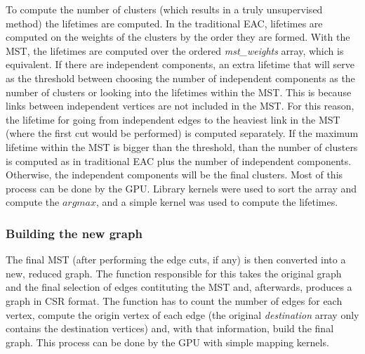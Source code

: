 To compute the number of clusters (which results in a truly unsupervised method) the lifetimes are computed.
In the traditional EAC, lifetimes are computed on the weights of the clusters by the order they are formed.
With the MST, the lifetimes are computed over the ordered \emph{mst\_weights} array, which is equivalent.
If there are independent components, an extra lifetime that will serve as the threshold between choosing the number of independent components as the number of clusters or looking into the lifetimes within the MST.
This is because links between independent vertices are not included in the MST.
For this reason, the lifetime for going from independent edges to the heaviest link in the MST (where the first cut would be performed) is computed separately.
If the maximum lifetime within the MST is bigger than the threshold, than the number of clusters is computed as in traditional EAC plus the number of independent components.
Otherwise, the independent components will be the final clusters.
Most of this process can be done by the GPU.
Library kernels were used to sort the array and compute the $arg max$, and a simple kernel was used to compute the lifetimes.

\subsubsection{Building the new graph}
The final MST (after performing the edge cuts, if any) is then converted into a new, reduced graph.
The function responsible for this takes the original graph and the final selection of edges contituting the MST and, afterwards, produces a graph in CSR format.
The function has to count the number of edges for each vertex, compute the origin vertex of each edge (the original \emph{destination} array only contains the destination vertices) and, with that information, build the final graph.
This process can be done by the GPU with simple mapping kernels.

